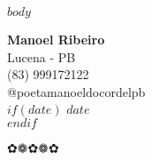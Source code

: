\documentclass[a6paper,10pt]{book}
\newcommand{\cordelornament}{%
  \begin{center}
    {\Large ✿❁✿❁✿}
  \end{center}
}
\begin{document}
\thispagestyle{empty}


\pagestyle{cordel}
\setcounter{page}{1}

$body$

\clearpage
\thispagestyle{empty}
\begin{center}
  \LARGE \textbf{Manoel Ribeiro}\\[0.5cm]
  \large Lucena - PB\\
  \large (83) 999172122\\
  \large @poetamanoeldocordelpb\\
  $if(date)$
  \large $date$\\
  $endif$
  \cordelornament
\end{center}
\end{document}
